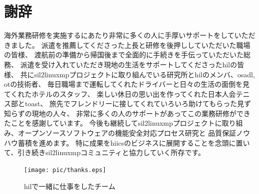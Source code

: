 \chapter*{謝辞}
海外業務研修を実施するにあたり非常に多くの人に手厚いサポートをしていただきました。
派遣を推薦してくださった上長と研修を後押ししていただいた職場の皆様、
渡航前の準備から帰国後まで全面的に手続きを手伝っていただいた総務、
派遣を受け入れていただき現地の生活をサポートしてくださった\acrshort{hil}の皆様、
共に\acrshort{sil2linuxmp}プロジェクトに取り組んでいる研究所と\acrshort{hil}のメンバ、\acrshort{osadl}, \acrshort{ot}の技術者、
毎日職場まで運転してくれたドライバーと日々の生活の面倒を見てくれたホテルのスタッフ、
楽しい休日の思い出を作ってくれた日本人会テニス部と\acrshort{toast}、
旅先でフレンドリーに接してくれていろいろ助けてもらった見ず知らずの現地の人々、
非常に多くの人のサポートがあってこの業務研修ができたことを感謝しています。
今後も継続して\acrshort{sil2linuxmp}プロジェクトに取り組み、オープンソースソフトウェアの機能安全対応プロセス研究と
品質保証ノウハウ蓄積を進めます。
特に成果を\acrshort{hiics}のビジネスに展開することを念頭に置いて、引き続き\acrshort{sil2linuxmp}コミュニティと協力していく所存です。
\newline
\begin{figure}[ht]
  \centering
  \texttt{[image: pic/thanks.eps]}
  \caption{\acrshort{hil}で一緒に仕事をしたチーム}
\end{figure}
